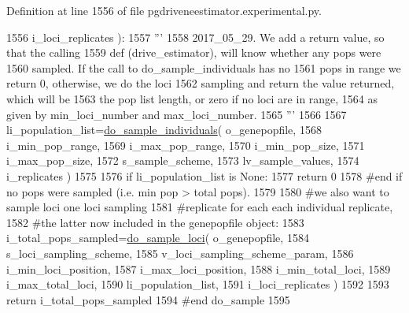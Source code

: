Definition at line 1556 of file pgdriveneestimator.\+experimental.\+py.


\begin{DoxyCode}
1556                 i\_loci\_replicates ):
1557     \textcolor{stringliteral}{'''}
1558 \textcolor{stringliteral}{    2017\_05\_29.  We add a return value, so that the calling}
1559 \textcolor{stringliteral}{    def (drive\_estimator), will know whether any pops were}
1560 \textcolor{stringliteral}{    sampled. If the call to do\_sample\_individuals has no}
1561 \textcolor{stringliteral}{    pops in range we return 0, otherwise, we do the loci}
1562 \textcolor{stringliteral}{    sampling and return the value returned, which will be}
1563 \textcolor{stringliteral}{    the pop list length, or zero if no loci are in range,}
1564 \textcolor{stringliteral}{    as given by min\_loci\_number and max\_loci\_number.}
1565 \textcolor{stringliteral}{    '''}
1566 
1567     li\_population\_list=\hyperlink{namespacenegui_1_1pgdriveneestimator_aa663cfeded8b8a3710d1a11192f12581}{do\_sample\_individuals}( o\_genepopfile, 
1568                     i\_min\_pop\_range,
1569                     i\_max\_pop\_range,
1570                     i\_min\_pop\_size,
1571                     i\_max\_pop\_size,
1572                     s\_sample\_scheme, 
1573                     lv\_sample\_values, 
1574                     i\_replicates )
1575 
1576     \textcolor{keywordflow}{if} li\_population\_list \textcolor{keywordflow}{is} \textcolor{keywordtype}{None}:
1577         \textcolor{keywordflow}{return} 0
1578     \textcolor{comment}{#end if no pops were sampled (i.e. min pop > total pops).  }
1579 
1580     \textcolor{comment}{#we also want to sample loci one loci sampling}
1581     \textcolor{comment}{#replicate for each each individual replicate,}
1582     \textcolor{comment}{#the latter now included in the genepopfile object:}
1583     i\_total\_pops\_sampled=\hyperlink{namespacenegui_1_1pgdriveneestimator_a408b2c39ad32bd720e35f2eace94509c}{do\_sample\_loci}( o\_genepopfile,
1584                     s\_loci\_sampling\_scheme,
1585                     v\_loci\_sampling\_scheme\_param,
1586                     i\_min\_loci\_position,
1587                     i\_max\_loci\_position,
1588                     i\_min\_total\_loci,
1589                     i\_max\_total\_loci,
1590                     li\_population\_list,
1591                     i\_loci\_replicates )
1592 
1593     \textcolor{keywordflow}{return} i\_total\_pops\_sampled
1594 \textcolor{comment}{#end do\_sample}
1595 
\end{DoxyCode}
